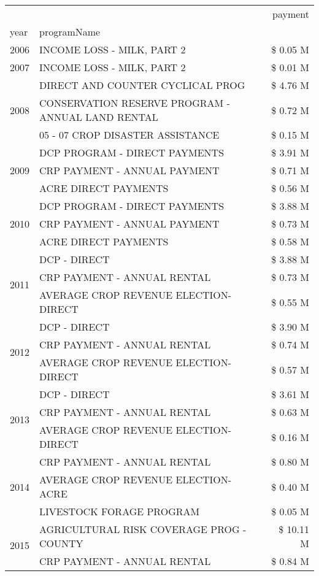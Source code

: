\begin{tabular}{llr}
\toprule
 &  & payment \\
year & programName &  \\
\midrule
2006 & INCOME LOSS - MILK, PART 2 & \$ 0.05 M \\
\cline{1-3}
2007 & INCOME LOSS - MILK, PART 2 & \$ 0.01 M \\
\cline{1-3}
\multirow[t]{3}{*}{2008} & DIRECT AND COUNTER CYCLICAL PROG & \$ 4.76 M \\
 & CONSERVATION RESERVE PROGRAM - ANNUAL LAND RENTAL & \$ 0.72 M \\
 & 05 - 07 CROP DISASTER ASSISTANCE & \$ 0.15 M \\
\cline{1-3}
\multirow[t]{3}{*}{2009} & DCP PROGRAM - DIRECT PAYMENTS & \$ 3.91 M \\
 & CRP PAYMENT - ANNUAL PAYMENT & \$ 0.71 M \\
 & ACRE DIRECT PAYMENTS & \$ 0.56 M \\
\cline{1-3}
\multirow[t]{3}{*}{2010} & DCP PROGRAM - DIRECT PAYMENTS & \$ 3.88 M \\
 & CRP PAYMENT - ANNUAL PAYMENT & \$ 0.73 M \\
 & ACRE DIRECT PAYMENTS & \$ 0.58 M \\
\cline{1-3}
\multirow[t]{3}{*}{2011} & DCP - DIRECT & \$ 3.88 M \\
 & CRP PAYMENT - ANNUAL RENTAL & \$ 0.73 M \\
 & AVERAGE CROP REVENUE ELECTION-DIRECT & \$ 0.55 M \\
\cline{1-3}
\multirow[t]{3}{*}{2012} & DCP - DIRECT & \$ 3.90 M \\
 & CRP PAYMENT - ANNUAL RENTAL & \$ 0.74 M \\
 & AVERAGE CROP REVENUE ELECTION-DIRECT & \$ 0.57 M \\
\cline{1-3}
\multirow[t]{3}{*}{2013} & DCP - DIRECT & \$ 3.61 M \\
 & CRP PAYMENT - ANNUAL RENTAL & \$ 0.63 M \\
 & AVERAGE CROP REVENUE ELECTION-DIRECT & \$ 0.16 M \\
\cline{1-3}
\multirow[t]{3}{*}{2014} & CRP PAYMENT - ANNUAL RENTAL & \$ 0.80 M \\
 & AVERAGE CROP REVENUE ELECTION-ACRE & \$ 0.40 M \\
 & LIVESTOCK FORAGE PROGRAM & \$ 0.05 M \\
\cline{1-3}
\multirow[t]{3}{*}{2015} & AGRICULTURAL RISK COVERAGE PROG - COUNTY & \$ 10.11 M \\
 & CRP PAYMENT - ANNUAL RENTAL & \$ 0.84 M \\

\end{tabular}
